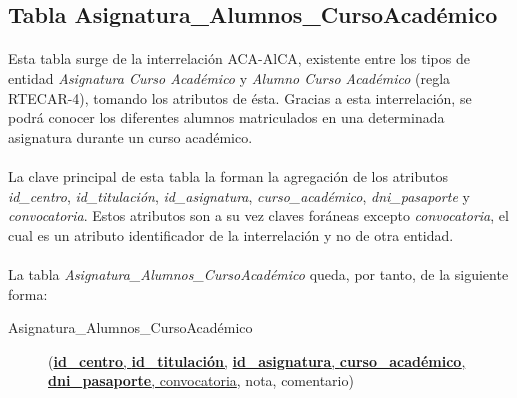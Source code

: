    \subsection{Tabla Asignatura\_Alumnos\_CursoAcadémico}

      \paragraph{}Esta tabla surge de la interrelación ACA-AlCA, existente entre
      los tipos de entidad \textit{Asignatura Curso Académico} y \textit{Alumno
      Curso Académico} (regla RTECAR-4), tomando los atributos de
      ésta. Gracias a esta interrelación, se podrá conocer los diferentes
      alumnos matriculados en una determinada asignatura durante un curso
      académico.

      \paragraph{}La clave principal de esta tabla la forman la agregación de
      los atributos \textit{id\_centro}, \textit{id\_titulación},
      \textit{id\_asignatura}, \textit{curso\_académico},
      \textit{dni\_pasaporte} y \textit{convocatoria}. Estos atributos son a su
      vez claves foráneas excepto \textit{convocatoria}, el cual es un atributo
      identificador de la interrelación y no de otra entidad.

      \paragraph{}La tabla
      \textit{Asignatura\_Alumnos\_CursoAcadémico} queda, por tanto,
      de la siguiente forma:

      \begin{description}
         \item[Asignatura\_Alumnos\_CursoAcadémico] \begin{flushleft}(\underline{\textbf{id\_centro}, \textbf{id\_titulación},}
         \underline{\textbf{id\_asignatura}, \textbf{curso\_académico},
         \textbf{dni\_pasaporte}, convocatoria}, nota,
         comentario)\end{flushleft}
      \end{description}